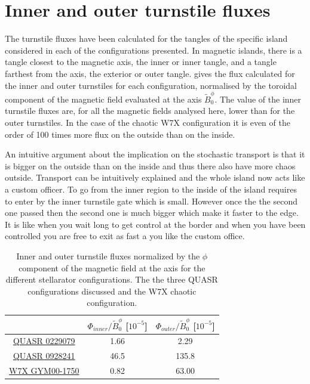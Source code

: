\section{Inner and outer turnstile fluxes}

The turnstile fluxes have been calculated for the tangles of the specific island considered in each of the configurations presented. In magnetic islands, there is a tangle closest to the magnetic axis, the inner or inner tangle, and a tangle farthest from the axis, the exterior or outer tangle.  gives the flux calculated for the inner and outer turnstiles for each configuration, normalised by the toroidal component of the magnetic field evaluated at the axis $\tilde{B}_0^\phi$. The value of the inner turnstile fluxes are, for all the magnetic fields analysed here, lower than for the outer turnstiles. In the case of the chaotic W7X configuration it is even of the order of 100 times more flux on the outside than on the inside.

An intuitive argument about the implication on the stochastic transport is that it is bigger on the outside than on the inside and thus there also have more chaos outside. Transport can be intuitively explained and the whole island now acts like a custom officer. To go from the inner region to the inside of the island requires to enter by the inner turnstile gate which is small. However once the the second one passed then the second one is much bigger which make it faster to the edge. It is like when you wait long to get control at the border and when you have been controlled you are free to exit as fast a you like the custom office.

\begin{table}[H]
    \centering
    \begin{tabular}{c|c|c}
        & $\Phi_{inner}/\tilde{B}_0^\phi$ [$10^{-5}$] & $\Phi_{outer}/\tilde{B}_0^\phi$ [$10^{-5}$]\\ 
        \hline \hyperref[sec:quars-0229079]{QUASR 0229079} & 1.66 & 2.29\\
        \hline \hyperref[sec:quars-0928241]{QUASR 0928241} & 46.5 & 135.8\\
        \hline \hyperref[sec:w7x]{W7X GYM00-1750} & 0.82 & 63.00\\
    \end{tabular}
    \caption{Inner and outer turnstile fluxes normalized by the $\phi$ component of the magnetic field at the axis for the different stellarator configurations. The the three QUASR configurations discussed and the W7X chaotic configuration.}
    \label{tab:inner-outer-fluxes}
\end{table}